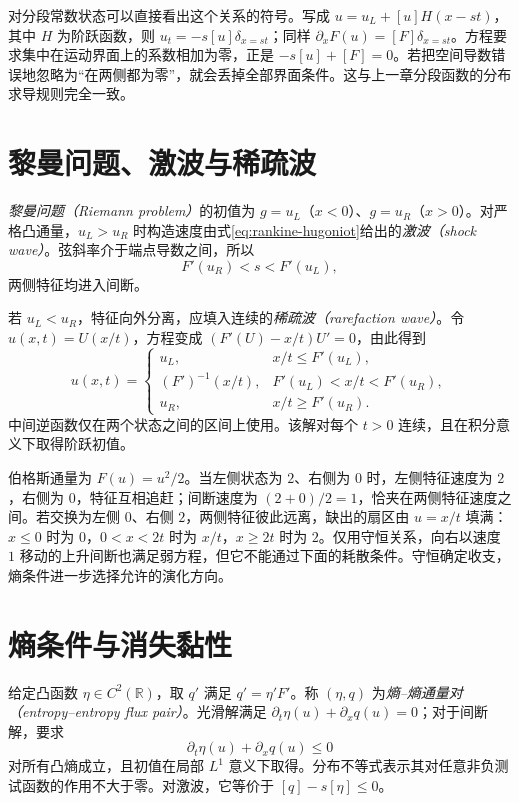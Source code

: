 对分段常数状态可以直接看出这个关系的符号。写成 $u=u_L+[u]H(x-st)$，其中 $H$ 为阶跃函数，则 $u_t=-s[u]\delta_{x=st}$；同样 $\partial_xF(u)=[F]\delta_{x=st}$。方程要求集中在运动界面上的系数相加为零，正是 $-s[u]+[F]=0$。若把空间导数错误地忽略为“在两侧都为零”，就会丢掉全部界面条件。这与上一章分段函数的分布求导规则完全一致。

\section{黎曼问题、激波与稀疏波}
\emph{黎曼问题（Riemann problem）}的初值为 $g=u_L$（$x<0$）、$g=u_R$（$x>0$）。对严格凸通量，$u_L>u_R$ 时构造速度由式\eqref{eq:rankine-hugoniot}给出的\emph{激波（shock wave）}。弦斜率介于端点导数之间，所以
\[
 F'(u_R)<s<F'(u_L),
\]
两侧特征均进入间断。

若 $u_L<u_R$，特征向外分离，应填入连续的\emph{稀疏波（rarefaction wave）}。令 $u(x,t)=U(x/t)$，方程变成 $(F'(U)-x/t)U'=0$，由此得到
\[
 u(x,t)=\begin{cases}
 u_L,&x/t\le F'(u_L),\\
 (F')^{-1}(x/t),&F'(u_L)<x/t<F'(u_R),\\
 u_R,&x/t\ge F'(u_R).
 \end{cases}
\]
中间逆函数仅在两个状态之间的区间上使用。该解对每个 $t>0$ 连续，且在积分意义下取得阶跃初值。

\begin{example}
伯格斯通量为 $F(u)=u^2/2$。当左侧状态为 $2$、右侧为 $0$ 时，左侧特征速度为 $2$，右侧为 $0$，特征互相追赶；间断速度为 $(2+0)/2=1$，恰夹在两侧特征速度之间。若交换为左侧 $0$、右侧 $2$，两侧特征彼此远离，缺出的扇区由 $u=x/t$ 填满：$x\le0$ 时为 $0$，$0<x<2t$ 时为 $x/t$，$x\ge2t$ 时为 $2$。仅用守恒关系，向右以速度 $1$ 移动的上升间断也满足弱方程，但它不能通过下面的耗散条件。守恒确定收支，熵条件进一步选择允许的演化方向。
\end{example}

\section{熵条件与消失黏性}
给定凸函数 $\eta\in C^2(\mathbb R)$，取 $q'$ 满足 $q'=\eta'F'$。称 $(\eta,q)$ 为\emph{熵--熵通量对（entropy--entropy flux pair）}。光滑解满足 $\partial_t\eta(u)+\partial_xq(u)=0$；对于间断解，要求
\begin{equation}
 \partial_t\eta(u)+\partial_xq(u)\le0
 \label{eq:entropy-inequality}
\end{equation}
对所有凸熵成立，且初值在局部 $L^1$ 意义下取得。分布不等式表示其对任意非负测试函数的作用不大于零。对激波，它等价于 $[q]-s[\eta]\le0$。

